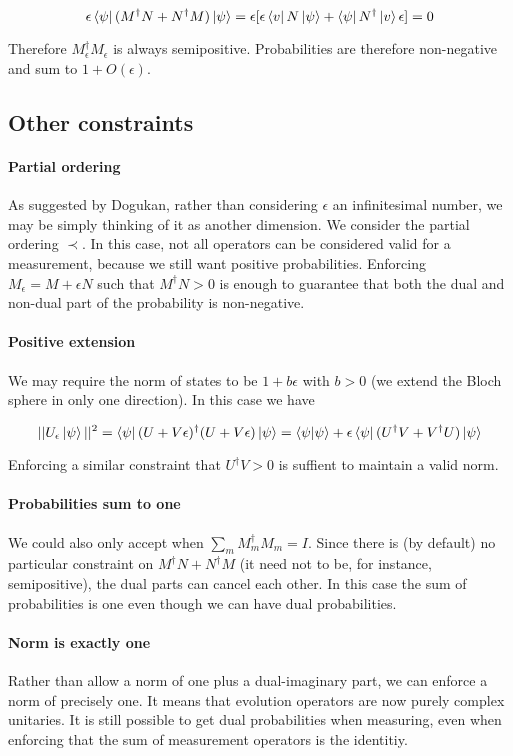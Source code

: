 \documentclass{article}
\newcommand{\e}{\epsilon}
\begin{document}
\begin{equation}
\e \bra{\psi} (M^\dagger N + N^\dagger M) \ket{\psi} = \e [\e \bra{v} N \ket{\psi} + \bra{\psi} N^\dagger \ket{v} \e] = 0
\end{equation}

Therefore $M_{\e}^\dagger M_{\e}$ is always semipositive. Probabilities are therefore non-negative and sum to $1 + O(\e)$.

\subsection{Other constraints}

\paragraph{Partial ordering} As suggested by Dogukan, rather than considering $\e$ an infinitesimal number, we may be simply thinking of it as another dimension. We consider the partial ordering $\prec$. In this case, not all operators can be considered valid for a measurement, because we still want positive probabilities. Enforcing $M_{\e} = M + \e N$ such that $M^\dagger N > 0$ is enough to guarantee that both the dual and non-dual part of the probability is non-negative.

\paragraph{Positive extension} We may require the norm of states to be $1 + b \e$ with $b > 0$ (we extend the Bloch sphere in only one direction). In this case we have

\begin{equation}
||U_{\e} \ket{\psi}||^2 = \bra{\psi} (U + V \e)^\dagger (U + V \e) \ket{\psi} = \braket{\psi | \psi} + \e \bra{\psi}(U^\dagger V + V^\dagger U) \ket{\psi}
\end{equation}

Enforcing a similar constraint that $U^\dagger V > 0$ is suffient to maintain a valid norm.

\paragraph{Probabilities sum to one} We could also only accept when $\sum_m M_m^\dagger M_m = I$. Since there is (by default) no particular constraint on $M^\dagger N + N^\dagger M$ (it need not to be, for instance, semipositive), the dual parts can cancel each other. In this case the sum of probabilities is one even though we can have dual probabilities.

\paragraph{Norm is exactly one} Rather than allow a norm of one plus a dual-imaginary part, we can enforce a norm of precisely one. It means that evolution operators are now purely complex unitaries. It is still possible to get dual probabilities when measuring, even when enforcing that the sum of measurement operators is the identitiy.



\end{document}
